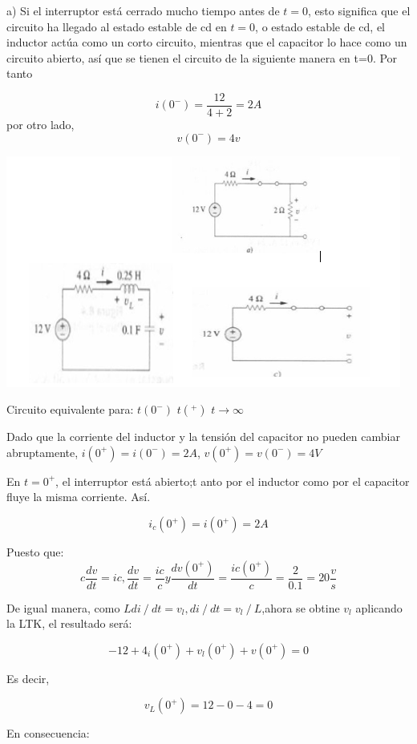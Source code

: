 \documentclass[oneside,12pt]{report}
\begin{document}
a)	Si el interruptor está cerrado mucho tiempo antes de $t=0$, esto significa que el circuito ha llegado al estado estable de cd en $t=0$, o estado estable de cd, el inductor actúa como un corto circuito, mientras que el capacitor lo hace como un circuito abierto, así que se tienen el circuito de la siguiente manera en t=0. Por tanto

\begin{equation}
	i(0^{-})=\frac{12}{4+2}=2A
\end{equation}
por otro lado,
\begin{equation}
	v(0^{-})=4v
\end{equation}
\begin{center}
	\includegraphics[width=0.9\linewidth]{ultimocirc}
\end{center}
Circuito equivalente para:
$t(0^{-})$
$t(^{+})$
$t\longrightarrow \infty$

Dado que la corriente del inductor y la tensión del capacitor no pueden cambiar abruptamente, 
$i(0^{+} )=i(0^{-} )=2A$,           $v(0^{+} )=v(0^{-} )=4V$

	En $t=0^{+}$, el interruptor está abierto;t anto por el inductor como por el capacitor fluye la misma corriente. Así.
	
$$i_c (0^+ )=i(0^+ )=2A$$

Puesto que:
$$c\frac{dv}{dt}=ic, \frac{dv}{dt}=\frac{ic}{c} y \frac{dv(0^{+})}{dt}=\frac{ic(0^{+})}{c}=\frac{2}{0.1}=20 \frac{v}{s}$$


De igual manera, como $Ldi⁄dt=v_l,di⁄dt=v_l⁄L$,ahora se obtine $v_l$ aplicando la LTK, el resultado será:

$$-12+4_i(0^{+})+v_l(0^{+})+v(0^{+})=0$$

Es decir,

$$v_L(0^{+})=12-0-4=0$$

En consecuencia:
\end{document}
